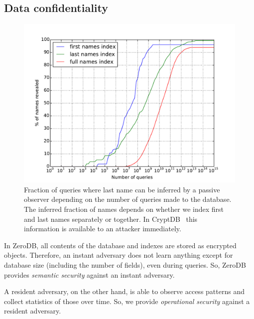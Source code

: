 \documentclass[notitlepage,longbibliography]{revtex4-1}
\begin{document}
\subsection{Data confidentiality}

\begin{figure}
	\begin{center}
        \includegraphics[width=0.7\columnwidth]{surname-attack.pdf}
	\end{center}
    \caption{
        Fraction of queries where last name can be inferred by a passive observer depending on the number of queries made to the database.
        The inferred fraction of names depends on whether we index first and last names separately or together.
        In CryptDB~\cite{cryptdb} this information is available to an attacker immediately.
    }
	\label{fig:surname-attack}
\end{figure}

In ZeroDB, all contents of the database and indexes are stored as encrypted objects.
Therefore, an instant adversary does not learn anything except for database size (including the number of fields), even during queries.
So, ZeroDB provides \emph{semantic security} against an instant adversary.

A resident adversary, on the other hand, is able to observe access patterns and collect statistics of those over time.
So, we provide \emph{operational security} against a resident adversary.
\end{document}

